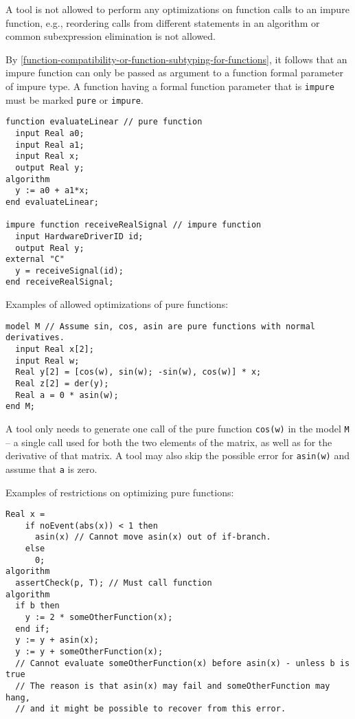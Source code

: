 \begin{nonnormative}
A tool is not allowed to perform any optimizations on function
calls to an impure function, e.g., reordering calls from different
statements in an algorithm or common subexpression elimination is not
allowed.
\end{nonnormative}

By \cref{function-compatibility-or-function-subtyping-for-functions}, it follows that an impure function can only be passed as argument to a function formal parameter of impure type.
A function having a formal function parameter that is \lstinline!impure! must be marked \lstinline!pure! or \lstinline!impure!.

\begin{example}
\begin{lstlisting}[language=modelica]
function evaluateLinear // pure function
  input Real a0;
  input Real a1;
  input Real x;
  output Real y;
algorithm
  y := a0 + a1*x;
end evaluateLinear;

impure function receiveRealSignal // impure function
  input HardwareDriverID id;
  output Real y;
external "C"
  y = receiveSignal(id);
end receiveRealSignal;
\end{lstlisting}
Examples of allowed optimizations of pure functions:
\begin{lstlisting}[language=modelica]
model M // Assume sin, cos, asin are pure functions with normal derivatives.
  input Real x[2];
  input Real w;
  Real y[2] = [cos(w), sin(w); -sin(w), cos(w)] * x;
  Real z[2] = der(y);
  Real a = 0 * asin(w);
end M;
\end{lstlisting}
A tool only needs to generate one call of the pure function \lstinline!cos(w)! in the model \lstinline!M! -- a single call used for both the two elements of the matrix, as well as for the derivative of that matrix.
A tool may also skip the possible error for \lstinline!asin(w)! and assume that \lstinline!a! is zero.

Examples of restrictions on optimizing pure functions:
\begin{lstlisting}[language=modelica]
  Real x =
    if noEvent(abs(x)) < 1 then
      asin(x) // Cannot move asin(x) out of if-branch.
    else
      0;
algorithm
  assertCheck(p, T); // Must call function
algorithm
  if b then
    y := 2 * someOtherFunction(x);
  end if;
  y := y + asin(x);
  y := y + someOtherFunction(x);
  // Cannot evaluate someOtherFunction(x) before asin(x) - unless b is true
  // The reason is that asin(x) may fail and someOtherFunction may hang,
  // and it might be possible to recover from this error.
\end{lstlisting}
\end{example}

